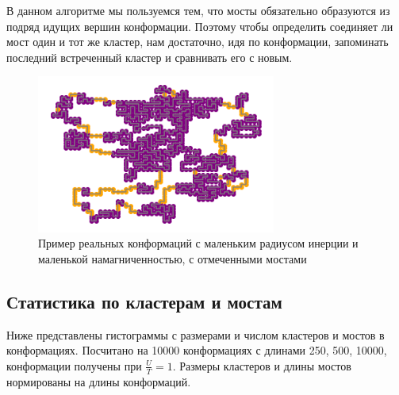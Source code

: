 В данном алгоритме мы пользуемся тем, что мосты обязательно образуются из подряд идущих вершин конформации. Поэтому чтобы определить соединяет ли мост один и тот же кластер, нам достаточно, идя по конформации, запоминать последний встреченный кластер и сравнивать его с новым.

\begin{figure}[ht]
	\centering
	\includegraphics[width=0.70\textwidth]{../images/bridges_example_1.png}  
	\caption{Пример реальных конформаций с маленьким радиусом инерции и маленькой намагниченностью, с отмеченными мостами}
	\label{fig:clusters_and_bridges}
\end{figure}

\subsection{Статистика по кластерам и мостам}
Ниже представлены гистограммы с размерами и числом кластеров и мостов в конформациях. Посчитано на 10000 конформациях с длинами 250, 500, 10000, конформации получены при $\frac{U}{T} = 1$. Размеры кластеров и длины мостов нормированы на длины конформаций. 


